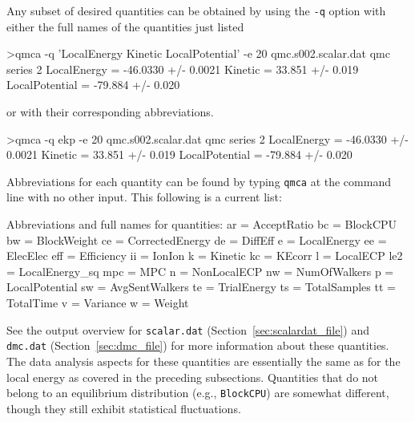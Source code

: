Any subset of desired quantities can be obtained by using the 
\texttt{-q} option with either the full names of the quantities 
just listed 
\begin{shade}
>qmca -q 'LocalEnergy Kinetic LocalPotential' -e 20 qmc.s002.scalar.dat 
qmc  series 2 
  LocalEnergy           =          -46.0330 +/-           0.0021 
  Kinetic               =            33.851 +/-            0.019 
  LocalPotential        =           -79.884 +/-            0.020 
\end{shade}
\noindent
or with their corresponding abbreviations.
\begin{shade}
>qmca -q ekp -e 20 qmc.s002.scalar.dat 
qmc  series 2 
  LocalEnergy           =          -46.0330 +/-           0.0021 
  Kinetic               =            33.851 +/-            0.019 
  LocalPotential        =           -79.884 +/-            0.020 
\end{shade}
\noindent
Abbreviations for each quantity can be found by typing \texttt{qmca}
at the command line with no other input.  This following is a current list:
\begin{shade}
  Abbreviations and full names for quantities:
    ar              = AcceptRatio
    bc              = BlockCPU
    bw              = BlockWeight
    ce              = CorrectedEnergy
    de              = DiffEff
    e               = LocalEnergy
    ee              = ElecElec
    eff             = Efficiency
    ii              = IonIon
    k               = Kinetic
    kc              = KEcorr
    l               = LocalECP
    le2             = LocalEnergy_sq
    mpc             = MPC
    n               = NonLocalECP
    nw              = NumOfWalkers
    p               = LocalPotential
    sw              = AvgSentWalkers
    te              = TrialEnergy
    ts              = TotalSamples
    tt              = TotalTime
    v               = Variance
    w               = Weight
\end{shade}
\noindent
See the output overview for \texttt{scalar.dat} 
(Section~\ref{sec:scalardat_file}) and \texttt{dmc.dat} 
(Section~\ref{sec:dmc_file}) for more information about 
these quantities.  The data analysis aspects for these 
quantities are essentially the same as for the local 
energy as covered in the preceding subsections. 
Quantities that do not belong to an equilibrium distribution 
(e.g., \texttt{BlockCPU}) are somewhat different, though they 
still exhibit statistical fluctuations.


